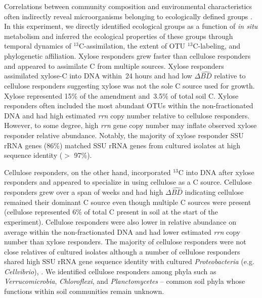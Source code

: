 Correlations between community composition and environmental characteristics
often indirectly reveal microorganisms belonging to ecologically defined groups
\citep{Fierer2007}. In this experiment, we directly identified ecological
groups as a function of \textit{in situ} metabolism and inferred the ecological
properties of these groups through temporal dynamics of $^{13}$C-assimilation,
the extent of OTU $^{13}$C-labeling, and phylogenetic affiliation.
Xylose responders grew faster than cellulose responders and appeared to
assimilate C from multiple sources. Xylose responders assimilated xylose-C into
DNA within~24 hours and had low $\Delta\hat{BD}$ relative to cellulose
responders suggesting xylose was not the sole C source used for growth. Xylose
represented 15\% of the amendment and~3.5\% of total soil C. Xylose responders
often included the most abundant OTUs within the non-fractionated DNA and had
high estimated \textit{rrn} copy number relative to cellulose responders.
However, to some degree, high \textit{rrn} gene copy number may inflate
observed xylose responder relative abundance. Notably, the majority of xylose
responder SSU rRNA genes (86\%) matched SSU rRNA genes from cultured isolates
at high sequence identity ($>$ 97\%). 

Cellulose responders, on the other hand, incorporated $^{13}$C into DNA after
xylose responders and appeared to specialize in using cellulose as a C source.
Cellulose responders grew over a span of weeks and had high $\Delta\hat{BD}$
indicating cellulose remained their dominant C source even though multiple
C sources were present (cellulose represented 6\% of total C present in
soil at the start of the experiment). Cellulose responders were also lower in
relative abundance on average within the non-fractionated DNA and had lower
estimated \textit{rrn} copy number than xylose responders. The majority of
cellulose responders were not close relatives of cultured isolates although
a number of cellulose responders shared high SSU rRNA gene sequence identity
with cultured \textit{Proteobacteria} (e.g. \textit{Cellvibrio}), . We
identified cellulose responders among phyla such as \textit{Verrucomicrobia},
\textit{Chloroflexi}, and \textit{Planctomycetes} -- common soil phyla whose
functions within soil communities remain unknown.

